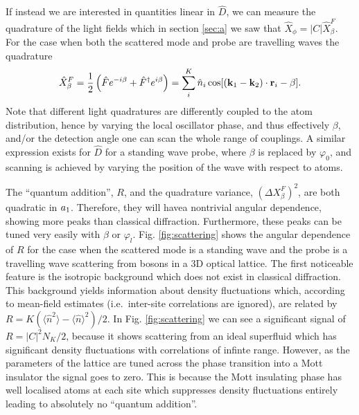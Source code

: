 If instead we are interested in quantities linear in $\hat{D}$, we can
measure the quadrature of the light fields which in section
\ref{sec:a} we saw that $\hat{X}_\phi = |C| \hat{X}^F_\beta$. For the
case when both the scattered mode and probe are travelling waves the
quadrature
\begin{equation} 
  \hat{X}^F_\beta = \frac{1}{2} \left( \hat{F} e^{-i \beta} +
    \hat{F}^\dagger e^{i \beta} \right) = \sum_i^K \hat{n}_i\cos[(\mathbf{k}_1 - \mathbf{k}_2) \cdot
  \mathbf{r}_i - \beta].
\end{equation} 
Note that different light quadratures are differently coupled to the
atom distribution, hence by varying the local oscillator phase, and
thus effectively $\beta$, and/or the detection angle one can scan the
whole range of couplings. A similar expression exists for $\hat{D}$
for a standing wave probe, where $\beta$ is replaced by $\varphi_0$,
and scanning is achieved by varying the position of the wave with
respect to atoms.

The ``quantum addition'', $R$, and the quadrature variance,
$(\Delta X^F_\beta)^2$, are both quadratic in $a_1$. Therefore, they
will havea nontrivial angular dependence, showing more peaks than
classical diffraction. Furthermore, these peaks can be tuned very
easily with $\beta$ or $\varphi_l$. Fig. \ref{fig:scattering} shows
the angular dependence of $R$ for the case when the scattered mode is
a standing wave and the probe is a travelling wave scattering from
bosons in a 3D optical lattice. The first noticeable feature is the
isotropic background which does not exist in classical
diffraction. This background yields information about density
fluctuations which, according to mean-field estimates (i.e.~inter-site
correlations are ignored), are related by
$R = K( \langle \hat{n}^2 \rangle - \langle \hat{n} \rangle^2 )/2$. In
Fig. \ref{fig:scattering} we can see a significant signal of
$R = |C|^2 N_K/2$, because it shows scattering from an ideal
superfluid which has significant density fluctuations with
correlations of infinte range. However, as the parameters of the
lattice are tuned across the phase transition into a Mott insulator
the signal goes to zero. This is because the Mott insulating phase has
well localised atoms at each site which suppresses density
fluctuations entirely leading to absolutely no ``quantum addition''.

